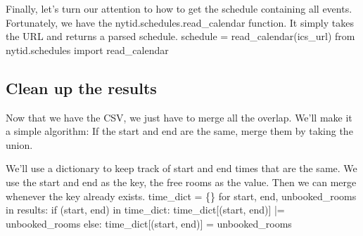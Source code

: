 Finally, let's turn our attention to how to get the schedule containing all 
events.
Fortunately, we have the {\Tt{}nytid.schedules.read{\_}calendar\nwendquote} function.
It simply takes the URL and returns a parsed schedule.
\nwenddocs{}\endmoddef\nwstartdeflinemarkup{}\nwenddeflinemarkup
schedule = read_calendar(ics_url)
\nwendcode{}\plusendmoddef\nwstartdeflinemarkup{}\nwenddeflinemarkup
from nytid.schedules import read_calendar
\nwendcode{}\nwdocspar


\subsection{Clean up the results}

Now that we have the CSV, we just have to merge all the overlap.
We'll make it a simple algorithm:
If the start and end are the same, merge them by taking the union.

We'll use a dictionary to keep track of start and end times that are the same.
We use the start and end as the key, the free rooms as the value.
Then we can merge whenever the key already exists.
\nwenddocs{}\endmoddef\nwstartdeflinemarkup{}\nwenddeflinemarkup
time_dict = \{\}
for start, end, unbooked_rooms in results:
  if (start, end) in time_dict:
    time_dict[(start, end)] |= unbooked_rooms
  else:
    time_dict[(start, end)] = unbooked_rooms

